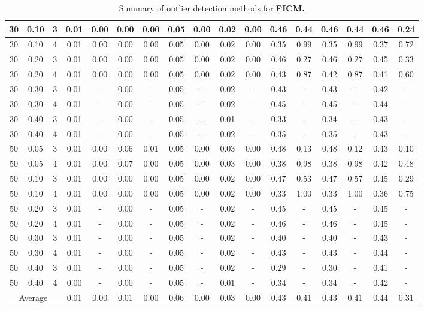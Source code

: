 \documentclass[12pt]{article}
\begin{document}
\begin{table}[H]
{\begin{tabular}{|*{17}{c|}|}
30 & 0.10 & 3 & 0.01 & 0.00 & 0.00 & 0.00 & 0.05 & 0.00 & 0.02 & 0.00 & 0.46 & 0.44 & 0.46 & 0.44 & 0.46 & 0.24 \\ \hline
30 & 0.10 & 4 & 0.01 & 0.00 & 0.00 & 0.00 & 0.05 & 0.00 & 0.02 & 0.00 & 0.35 & 0.99 & 0.35 & 0.99 & 0.37 & 0.72 \\ \hline
30 & 0.20 & 3 & 0.01 & 0.00 & 0.00 & 0.00 & 0.05 & 0.00 & 0.02 & 0.00 & 0.46 & 0.27 & 0.46 & 0.27 & 0.45 & 0.33 \\ \hline
30 & 0.20 & 4 & 0.01 & 0.00 & 0.00 & 0.00 & 0.05 & 0.00 & 0.02 & 0.00 & 0.43 & 0.87 & 0.42 & 0.87 & 0.41 & 0.60 \\ \hline
30 & 0.30 & 3 & 0.01 & - & 0.00 & - & 0.05 & - & 0.02 & - & 0.43 & - & 0.43 & - & 0.42 & - \\ \hline
30 & 0.30 & 4 & 0.01 & - & 0.00 & - & 0.05 & - & 0.02 & - & 0.45 & - & 0.45 & - & 0.44 & - \\ \hline
30 & 0.40 & 3 & 0.01 & - & 0.00 & - & 0.05 & - & 0.01 & - & 0.33 & - & 0.34 & - & 0.43 & - \\ \hline
30 & 0.40 & 4 & 0.01 & - & 0.00 & - & 0.05 & - & 0.02 & - & 0.35 & - & 0.35 & - & 0.43 & - \\ \hline
50 & 0.05 & 3 & 0.01 & 0.00 & 0.06 & 0.01 & 0.05 & 0.00 & 0.03 & 0.00 & 0.48 & 0.13 & 0.48 & 0.12 & 0.43 & 0.10 \\ \hline
50 & 0.05 & 4 & 0.01 & 0.00 & 0.07 & 0.00 & 0.05 & 0.00 & 0.03 & 0.00 & 0.38 & 0.98 & 0.38 & 0.98 & 0.42 & 0.48 \\ \hline
50 & 0.10 & 3 & 0.01 & 0.00 & 0.00 & 0.00 & 0.05 & 0.00 & 0.02 & 0.00 & 0.47 & 0.53 & 0.47 & 0.57 & 0.45 & 0.29 \\ \hline
50 & 0.10 & 4 & 0.01 & 0.00 & 0.00 & 0.00 & 0.05 & 0.00 & 0.02 & 0.00 & 0.33 & 1.00 & 0.33 & 1.00 & 0.36 & 0.75 \\ \hline
50 & 0.20 & 3 & 0.01 & - & 0.00 & - & 0.05 & - & 0.02 & - & 0.45 & - & 0.45 & - & 0.45 & - \\ \hline
50 & 0.20 & 4 & 0.01 & - & 0.00 & - & 0.05 & - & 0.02 & - & 0.46 & - & 0.46 & - & 0.45 & - \\ \hline
50 & 0.30 & 3 & 0.01 & - & 0.00 & - & 0.05 & - & 0.02 & - & 0.40 & - & 0.40 & - & 0.43 & - \\ \hline
50 & 0.30 & 4 & 0.01 & - & 0.00 & - & 0.05 & - & 0.02 & - & 0.43 & - & 0.43 & - & 0.44 & - \\ \hline
50 & 0.40 & 3 & 0.01 & - & 0.00 & - & 0.05 & - & 0.02 & - & 0.29 & - & 0.30 & - & 0.41 & - \\ \hline
50 & 0.40 & 4 & 0.00 & - & 0.00 & - & 0.05 & - & 0.01 & - & 0.34 & - & 0.34 & - & 0.42 & - \\ \hline
\multicolumn{3}{|c|}{Average} & 0.01 & 0.00 & 0.01 & 0.00 & 0.06 & 0.00 & 0.03 & 0.00 & 0.43 & 0.41 & 0.43 & 0.41 & 0.44 & 0.31 \\ \hline
\end{tabular}}
\endgroup
\centering
\caption{Summary of outlier detection methods for \textbf{FICM.}}
\label{tab:ficm_one_group}
\end{table}
\end{document}
